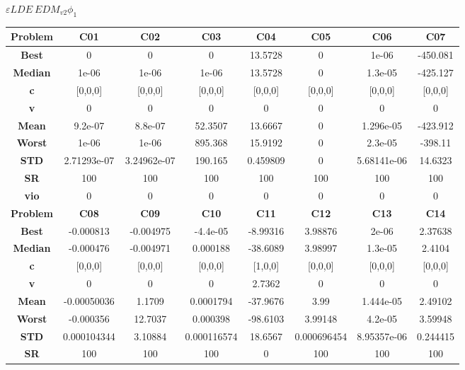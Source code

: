 \documentclass{IEEEtran}
\begin{document}
\begin{center}
$\varepsilon LDE\ EDM_{v2} \phi_1$\\
  \begin{tabular}{|c|c|c|c|c|c|c|c|}
    \hline 
    \textbf{Problem} & \textbf{C01} & \textbf{C02} & \textbf{C03} & \textbf{C04} & \textbf{C05} & \textbf{C06} & \textbf{C07} \\ 
    \hline\hline 
    \textbf{Best} & 0 & 0 & 0 & 13.5728 & 0 & 1e-06 & -450.081\\ 
    \textbf{Median} & 1e-06 & 1e-06 & 1e-06 & 13.5728 & 0 & 1.3e-05 & -425.127\\ 
    \textbf{c} & [0,0,0] & [0,0,0] & [0,0,0] & [0,0,0] & [0,0,0] & [0,0,0] & [0,0,0]\\ 
    \textbf{v} & 0 & 0 & 0 & 0 & 0 & 0 & 0\\ 
    \textbf{Mean} & 9.2e-07 & 8.8e-07 & 52.3507 & 13.6667 & 0 & 1.296e-05 & -423.912\\ 
    \textbf{Worst} & 1e-06 & 1e-06 & 895.368 & 15.9192 & 0 & 2.3e-05 & -398.11\\ 
    \textbf{STD} & 2.71293e-07 & 3.24962e-07 & 190.165 & 0.459809 & 0 & 5.68141e-06 & 14.6323\\ 
    \textbf{SR} & 100 & 100 & 100 & 100 & 100 & 100 & 100\\ 
    \textbf{vio} & 0 & 0 & 0 & 0 & 0 & 0 & 0\\ 
    \hline 
    \hline 
    \textbf{Problem} & \textbf{C08} & \textbf{C09} & \textbf{C10} & \textbf{C11} & \textbf{C12} & \textbf{C13} & \textbf{C14} \\ 
    \hline\hline 
    \textbf{Best} & -0.000813 & -0.004975 & -4.4e-05 & -8.99316 & 3.98876 & 2e-06 & 2.37638\\ 
    \textbf{Median} & -0.000476 & -0.004971 & 0.000188 & -38.6089 & 3.98997 & 1.3e-05 & 2.4104\\ 
    \textbf{c} & [0,0,0] & [0,0,0] & [0,0,0] & [1,0,0] & [0,0,0] & [0,0,0] & [0,0,0]\\ 
    \textbf{v} & 0 & 0 & 0 & 2.7362 & 0 & 0 & 0\\ 
    \textbf{Mean} & -0.00050036 & 1.1709 & 0.0001794 & -37.9676 & 3.99 & 1.444e-05 & 2.49102\\ 
    \textbf{Worst} & -0.000356 & 12.7037 & 0.000398 & -98.6103 & 3.99148 & 4.2e-05 & 3.59948\\ 
    \textbf{STD} & 0.000104344 & 3.10884 & 0.000116574 & 18.6567 & 0.000696454 & 8.95357e-06 & 0.244415\\ 
    \textbf{SR} & 100 & 100 & 100 & 0 & 100 & 100 & 100\\ 

\end{tabular}
\end{center}
\end{document}
